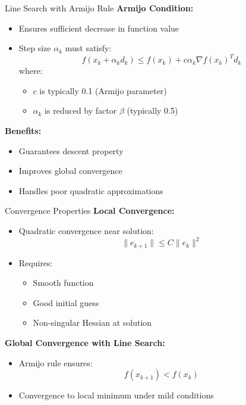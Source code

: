 \documentclass[10pt]{beamer}
\begin{document}
\begin{frame}[fragile]{Line Search with Armijo Rule}
    \textbf{Armijo Condition:}
    \begin{itemize}
        \item Ensures sufficient decrease in function value
        \item Step size $\alpha_k$ must satisfy:
        \[ f(x_k + \alpha_k d_k) \leq f(x_k) + c\alpha_k\nabla f(x_k)^T d_k \]
        where:
        \begin{itemize}
            \item $c$ is typically 0.1 (Armijo parameter)
            \item $\alpha_k$ is reduced by factor $\beta$ (typically 0.5)
        \end{itemize}
    \end{itemize}
    
    \textbf{Benefits:}
    \begin{itemize}
        \item Guarantees descent property
        \item Improves global convergence
        \item Handles poor quadratic approximations
    \end{itemize}
\end{frame}

\begin{frame}[fragile]{Convergence Properties}
    \textbf{Local Convergence:}
    \begin{itemize}
        \item Quadratic convergence near solution:
        \[ \|e_{k+1}\| \leq C\|e_k\|^2 \]
        \item Requires:
        \begin{itemize}
            \item Smooth function
            \item Good initial guess
            \item Non-singular Hessian at solution
        \end{itemize}
    \end{itemize}
    
    \textbf{Global Convergence with Line Search:}
    \begin{itemize}
        \item Armijo rule ensures:
        \[ f(x_{k+1}) < f(x_k) \]
        \item Convergence to local minimum under mild conditions
    \end{itemize}
\end{frame}
\end{document}
